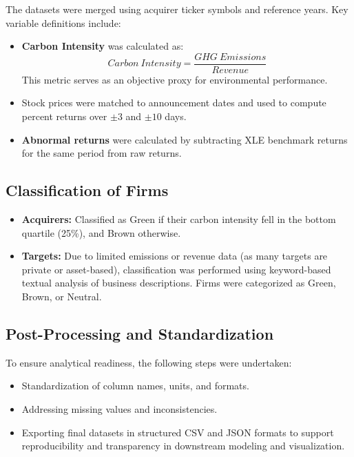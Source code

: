 \documentclass[a4paper]{article}
\begin{document}
The datasets were merged using acquirer ticker symbols and reference years. Key variable definitions include:

\begin{itemize}
    \setlength{\itemsep}{0pt} 
    \item \textbf{Carbon Intensity} was calculated as:
\begin{equation}
\label{eq:carbon_intensity}
Carbon\ Intensity = \frac{GHG\ Emissions}{Revenue}
\end{equation}
    This metric serves as an objective proxy for environmental performance.
    \item Stock prices were matched to announcement dates and used to compute percent returns over \(\pm3\) and \(\pm10\) days. 
    \item \textbf{Abnormal returns} were calculated by subtracting XLE benchmark returns for the same period from raw returns.
\end{itemize}

\subsection{Classification of Firms}

\begin{itemize}
    \setlength{\itemsep}{0pt} 
    \item \textbf{Acquirers:} Classified as Green if their carbon intensity fell in the bottom quartile (25\%), and Brown otherwise.
    \item \textbf{Targets:} Due to limited emissions or revenue data (as many targets are private or asset-based), classification was performed using keyword-based textual analysis of business descriptions. Firms were categorized as Green, Brown, or Neutral.
\end{itemize}

\subsection{Post-Processing and Standardization}

To ensure analytical readiness, the following steps were undertaken:

\begin{itemize}
    \setlength{\itemsep}{0pt} 
    \item Standardization of column names, units, and formats.
    \item Addressing missing values and inconsistencies.
    \item Exporting final datasets in structured CSV and JSON formats to support reproducibility and transparency in downstream modeling and visualization.
\end{itemize}
\end{document}
